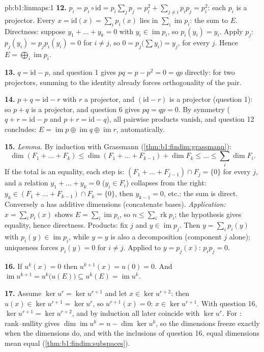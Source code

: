 \begin{solution}{pb:b1:linmaps:1}
\textbf{12.} $p_i = p_i \circ \mathrm{id} = p_i\sum_j p_j =
p_i^2 + \sum_{j \neq i} p_i p_j = p_i^2$: each $p_i$ is a
projector. Every $x = \mathrm{id}(x) = \sum_i p_i(x)$ lies in
$\sum_i \operatorname{im} p_i$: the  sum to $E$.
Directness: suppose $y_1 + \dots + y_k = 0$ with $y_i \in
\operatorname{im} p_i$, so $p_i(y_i) = y_i$. Apply $p_j$: $p_j
(y_i) = p_j p_i (y_i) = 0$ for $i \neq j$, so $0 = p_j\bigl(\sum
y_i\bigr) = y_j$, for every $j$. Hence $E = \bigoplus_i
\operatorname{im} p_i$.

\textbf{13.} $q = \mathrm{id} - p$, and question 1 gives $pq =
p - p^2 = 0 = qp$ directly: for two projectors, summing to the
identity already forces orthogonality of the pair.

\textbf{14.} $p + q = \mathrm{id} - r$ with $r$ a projector, and
$(\mathrm{id} - r)$ is a projector (question 1): so $p + q$ is a
projector, and question 6 gives $pq = qp = 0$. By symmetry ($q +
r = \mathrm{id} - p$ and $p + r = \mathrm{id} - q$), all
pairwise products vanish, and question 12 concludes: $E =
\operatorname{im} p \oplus \operatorname{im} q \oplus
\operatorname{im} r$, automatically.

\textbf{15.} \emph{Lemma.} By induction with Grassmann
(\cref{thm:b1:findim:grassmann}):
\[
\dim(F_1 + \dots + F_k) \leq \dim(F_1 + \dots + F_{k-1}) + \dim
F_k \leq \dots \leq \sum_i \dim F_i .
\]
If the total is an equality, each step is: $(F_1 + \dots +
F_{j-1}) \cap F_j = \{0\}$ for every $j$, and a relation $y_1 +
\dots + y_k = 0$ ($y_i \in F_i$) collapses from the right: $y_k
\in (F_1 + \dots + F_{k-1}) \cap F_k = \{0\}$, then $y_{k-1} =
0$, etc.: the sum is direct. Conversely a  has
additive dimensions (concatenate bases). \emph{Application:}
$x = \sum_i p_i(x)$ shows $E = \sum_i \operatorname{im} p_i$,
so $n \leq \sum_i \operatorname{rk} p_i$; the hypothesis gives
equality, hence directness. Products: fix $j$ and $y \in
\operatorname{im} p_j$. Then $y = \sum_i p_i(y)$ with $p_i(y)
\in \operatorname{im} p_i$, while $y = y$ is also a
decomposition (component $j$ alone); uniqueness forces $p_i(y)
= 0$ for $i \neq j$. Applied to $y = p_j(x)$: $p_i p_j = 0$.

\textbf{16.} If $u^k(x) = 0$ then $u^{k+1}(x) = u(0) = 0$. And
$\operatorname{im} u^{k+1} = u^k\bigl(u(E)\bigr) \subseteq
u^k(E) = \operatorname{im} u^k$.

\textbf{17.} Assume $\ker u^{r} = \ker u^{r+1}$ and let $x \in
\ker u^{r+2}$: then $u(x) \in \ker u^{r+1} = \ker u^{r}$, so
$u^{r+1}(x) = 0$: $x \in \ker u^{r+1}$. With question 16,
$\ker u^{r+1} = \ker u^{r+2}$, and by induction all later
 coincide with $\ker u^{r}$. For : rank--nullity
gives $\dim\operatorname{im} u^k = n - \dim\ker u^k$, so the
 dimensions freeze exactly when the  dimensions do,
and with the inclusions of question 16, equal dimensions mean
equal  (\cref{thm:b1:findim:subspaces}).


\end{solution}

